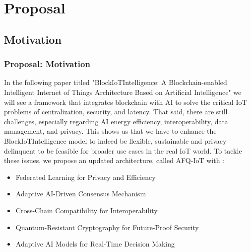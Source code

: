 \documentclass [xcolor=svgnames] {beamer}
\begin{document}
\section{Proposal}
\begin{frame}
\small
\subsection{Motivation}
\frametitle{Proposal: Motivation}
In the following paper titled "BlockIoTIntelligence: A Blockchain-enabled Intelligent Internet of Things Architecture Based on Artificial Intelligence" we will see a framework that integrates blockchain with AI to solve the critical IoT problems of centralization, security, and latency. That said, there are still challenges, especially regarding AI energy efficiency, interoperability, data management, and privacy. This shows us that we have to enhance the BlockIoTIntelligence model to indeed be flexible, sustainable and privacy delinquent to be feasible for broader use cases in the real IoT world. To tackle these issues, we propose an updated architecture, called AFQ-IoT with : 
\begin{itemize}
\item Federated Learning for Privacy and Efficiency
\item Adaptive AI-Driven Consensus Mechanism
\item Cross-Chain Compatibility for Interoperability
\item Quantum-Resistant Cryptography for Future-Proof Security
\item  Adaptive AI Models for Real-Time Decision Making
\end{itemize}

\end{frame}
\end{document}
